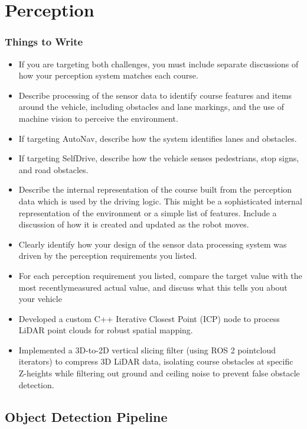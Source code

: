\section{Perception}
\subsubsection*{Things to Write}

\begin{itemize}
  \item If you are targeting both challenges, you must include separate discussions of how your perception system matches each course.
  \item Describe processing of the sensor data to identify course features and items around the vehicle, including obstacles and lane markings, and the use of machine vision to perceive the environment.
  \item If targeting AutoNav, describe how the system identifies lanes and obstacles.
  \item If targeting SelfDrive, describe how the vehicle senses pedestrians, stop signs, and road obstacles.
  \item Describe the internal representation of the course built from the perception data which is used by the driving logic. This might be a sophisticated internal representation of the environment or a simple list of features. Include a discussion of how it is created and updated as the robot moves.
  \item Clearly identify how your design of the sensor data processing system was driven by the perception requirements you listed.
  \item For each perception requirement you listed, compare the target value with the most recentlymeasured actual value, and discuss what this tells you about your vehicle
  \item Developed a custom C++ Iterative Closest Point (ICP) node to process LiDAR point clouds for robust spatial mapping.
  \item Implemented a 3D-to-2D vertical slicing filter (using ROS 2 pointcloud iterators) to compress 3D LiDAR data, isolating course obstacles at specific Z-heights while filtering out ground and ceiling noise to prevent false obstacle detection.
\end{itemize}

\subsection{Object Detection Pipeline}
 
